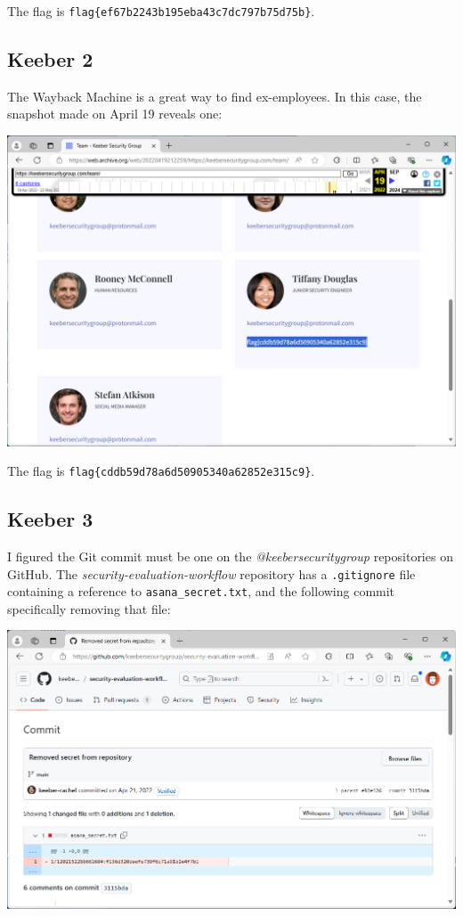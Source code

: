 \documentclass{article}
\begin{document}
\noindent
The flag is \texttt{flag\{ef67b2243b195eba43c7dc797b75d75b\}}.

\subsection{Keeber 2}

The Wayback Machine is a great way to find ex-employees. In this case, the snapshot made on April 19 reveals one:

\noindent
\begin{center}
\includegraphics[width=16cm]{keeber2/wayback-machine.png}
\end{center}

\noindent
The flag is \texttt{flag\{cddb59d78a6d50905340a62852e315c9\}}.

\subsection{Keeber 3}

I figured the Git commit must be one on the \textit{@keebersecuritygroup} repositories on GitHub. The \textit{security-evaluation-workflow} repository has a \texttt{.gitignore} file containing a reference to \texttt{asana_secret.txt}, and the following commit specifically removing that file:

\noindent
\begin{center}
\includegraphics[width=16cm]{keeber3/screenshot1.png}
\end{center}
\end{document}
